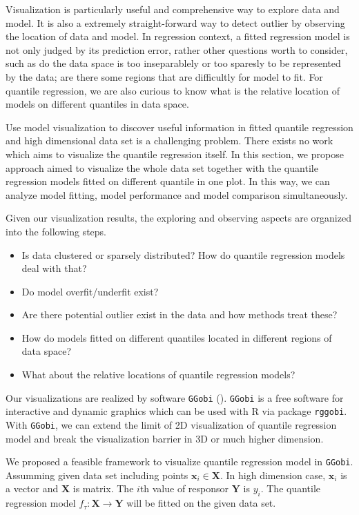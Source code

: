 \documentclass[11pt,a4paper,]{article}
\theoremstyle{definition}
\theoremstyle{definition}
\theoremstyle{remark}
\begin{document}
Visualization is particularly useful and comprehensive way to explore
data and model. It is also a extremely straight-forward way to detect
outlier by observing the location of data and model. In regression
context, a fitted regression model is not only judged by its prediction
error, rather other questions worth to consider, such as do the data
space is too inseparablely or too sparesly to be represented by the
data; are there some regions that are difficultly for model to fit. For
quantile regression, we are also curious to know what is the relative
location of models on different quantiles in data space.

Use model visualization to discover useful information in fitted
quantile regression and high dimensional data set is a challenging
problem. There exists no work which aims to visualize the quantile
regression itself. In this section, we propose approach aimed to
visualize the whole data set together with the quantile regression
models fitted on different quantile in one plot. In this way, we can
analyze model fitting, model performance and model comparison
simultaneously.

Given our visualization results, the exploring and observing aspects are
organized into the following steps.

\begin{itemize}
\item
  Is data clustered or sparsely distributed? How do quantile regression
  models deal with that?
\item
  Do model overfit/underfit exist?
\item
  Are there potential outlier exist in the data and how methods treat
  these?
\item
  How do models fitted on different quantiles located in different
  regions of data space?
\item
  What about the relative locations of quantile regression models?
\end{itemize}

Our visualizations are realized by software \texttt{GGobi}
(\textcite{swayne2003ggobi}). \texttt{GGobi} is a free software for
interactive and dynamic graphics which can be used with R via package
\texttt{rggobi}. With \texttt{GGobi}, we can extend the limit of 2D
visualization of quantile regression model and break the visualization
barrier in 3D or much higher dimension.

We proposed a feasible framework to visualize quantile regression model
in \texttt{GGobi}. Assumming given data set including points
\(\boldsymbol{x}_{i} \in \boldsymbol{X}\). In high dimension case,
\(\boldsymbol{x}_i\) is a vector and \(\boldsymbol{X}\) is matrix. The
\(i\)th value of responsor \(\boldsymbol{Y}\) is \(y_i\). The quantile
regression model \(f_{\tau}:\boldsymbol{X} \rightarrow \boldsymbol{Y}\)
will be fitted on the given data set.
\end{document}
